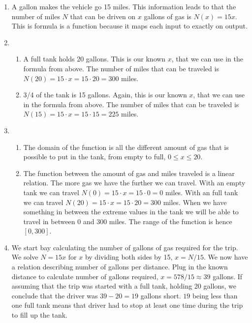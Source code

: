 \begin{enumerate}[label = (\alph*)]
  \item
    A gallon makes the vehicle go 15 miles. This information leads to that the number of miles $ N $ that can be driven on $ x $ gallons of gas is $ N(x) = 15x $. This is formula is a function because it maps each input to exactly on output.
  \item
    \begin{enumerate}[label = (\roman*)]
      \item
        A full tank holds 20 gallons. This is our known $ x $, that we can use in the formula from above. The number of miles that can be traveled is $ N(20) = 15 \cdot x = 15 \cdot 20 = 300 $ miles.
      \item
        3/4 of the tank is 15 gallons. Again, this is our known $ x $, that we can use in the formula from above. The number of miles that can be traveled is $ N(15) = 15 \cdot x = 15 \cdot 15 = 225 $ miles.
    \end{enumerate}
  \item
    \begin{enumerate}[label = (\roman*)]
      \item
        The domain of the function is all the different amount of gas that is possible to put in the tank, from empty to full, $ 0 \le x \le 20 $.
      \item
        The function between the amount of gas and miles traveled is a linear relation. The more gas we have the further we can travel. With an empty tank we can travel $ N(0) = 15 \cdot x = 15 \cdot 0 = 0 $ miles. With an full tank we can travel $ N(20) = 15 \cdot x = 15 \cdot 20 = 300 $ miles. When we have something in between the extreme values in the tank we will be able to travel in between 0 and 300 miles. The range of the function is hence $ [0,300] $.
    \end{enumerate}
  \item
    We start bay calculating the number of gallons of gas required for the trip. We solve $ N = 15x $ for $ x $ by dividing both sides by 15, $ x = N/15 $. We now have a relation describing number of gallons per distance. Plug in the known distance to calculate number of gallons required, $ x = 578 / 15 \approx 39 $ gallons. If assuming that the trip was started with a full tank, holding 20 gallons, we conclude that the driver was $ 39 - 20 = 19 $ gallons short. $ 19 $ being less than one full tank means that driver had to stop at least one time during the trip to fill up the tank.
\end{enumerate}

